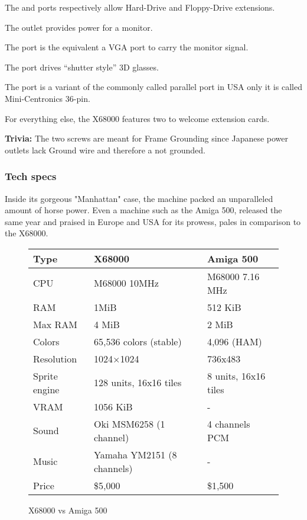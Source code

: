 The  and  ports respectively allow Hard-Drive and Floppy-Drive extensions.

The  outlet provides power for a monitor.

The  port is the equivalent a VGA port to carry the monitor signal.


The  port drives “shutter style” 3D glasses.

The  port is a variant of the commonly called parallel port in USA only it is called Mini-Centronics 36-pin. 

For everything else, the X68000 features two  to welcome extension cards.

\textbf{Trivia:} The two  screws are meant for Frame Grounding since Japanese power outlets lack Ground wire and therefore a not grounded.


\pagebreak



\subsubsection{Tech specs}  
Inside its gorgeous "Manhattan" case, the machine packed an unparalleled amount of horse power. Even a machine such as the Amiga 500, released the same year and praised in Europe and USA for its prowess, pales in comparison to the X68000. 


 \begin{figure}[H]
\begin{tabularx}{\textwidth}{lXX}
  \toprule    
  \textbf{Type } & \textbf{ X68000 } & \textbf{ Amiga 500 }\\  
  \toprule   
    
CPU & M68000 10MHz & M68000 7.16 MHz\\  
RAM & 1MiB & 512 KiB\\
Max RAM & 4 MiB & 2 MiB\\ 
Colors  & 65,536 colors (stable) & 4,096 (HAM) \\
Resolution & 1024×1024 & 736x483 \\
Sprite engine & 128 units, 16x16 tiles & 8 units, 16x16 tiles\\
VRAM & 1056 KiB & -\\
Sound & Oki MSM6258 (1 channel)  & 4 channels PCM\\ 
Music & Yamaha YM2151 (8 channels)  & -\\ 
Price & \$5,000 & \$1,500 \\
  \toprule   
\end{tabularx}
\caption*{X68000 vs Amiga 500}
\end{figure}



